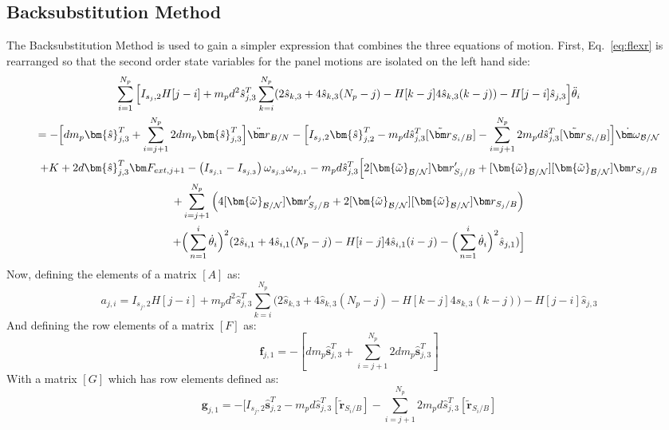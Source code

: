 \subsection{Backsubstitution Method}
The Backsubstitution Method is used to gain a simpler expression that combines the three equations of motion. First, Eq.~\eqref{eq:flexr} is rearranged so that the second order state variables for the panel motions are isolated on the left hand side:
\begin{multline}
	\sum^{N_p}_{i=1}\Big[I_{s_j,2} H[j-i] + m_p d^2 \hat{s}^{T}_{j,3} \sum^{N_p}_{k=i}(2\hat{s}_{k,3}+4\hat{s}_{k,3}(N_p-j) -H[k-j] 4\hat{s}_{k,3}(k-j)) - H[j-i]\hat{s}_{j,3} \Big] \ddot{\theta}_i \\
	= - \Big[d m_p\bm{\hat{s}}^{T}_{j,3}+\sum^{N_p}_{i=j+1}2 d m_p\bm{\hat{s}}^{T}_{j,3}\Big]\ddot{\bm r}_{B/N} - \Big[I_{s_j,2} \bm{\hat{s}}_{j,2}^T -m_p d \hat{s}^{T}_{j,3}[\tilde{{\bm r}}_{S_{i}/B}]-\sum^{N_p}_{i=j+1} 2 m_p d \hat{s}^{T}_{j,3}[\tilde{{\bm r}}_{S_{i}/B}]\Big]\dot{\bm\omega}_{\cal B/N} \\
	+ K + 2d\bm{\hat{s}}^{T}_{j,3}\bm F_{ext,j+1} - \left( I_{s_{j,1}} - I_{s_{j,3}}\right) \omega_{s_{j,3}} \omega_{s_{j,1}} - m_p d \hat{s}^{T}_{j,3}\Big[2[\bm{\tilde{\omega}}_{\cal B/N}]\bm r'_{S_{j}/B} + [\bm{\tilde{\omega}}_{\cal B/N}][\bm{\tilde{\omega}}_{\cal B/N}]\bm r_{S_{j}/B}\\
	+\sum^{N_p}_{i=j+1}\Big(4[\bm{\tilde{\omega}}_{\cal B/N}]\bm r'_{S_{j}/B} + 2[\bm{\tilde{\omega}}_{\cal B/N}][\bm{\tilde{\omega}}_{\cal B/N}]\bm r_{S_{j}/B} \Big) \\
	+ \Big( \sum^{i}_{n=1} \dot{\theta}_i \Big)^2 (2\hat{s}_{i,1}+4\hat{s}_{i,1}(N_p-j) -H[i-j] 4\hat{s}_{i,1}(i-j) - \Big( \sum^{i}_{n=1} \dot{\theta}_i\Big)^2 \hat{s}_{j,1} )\Big]
	\label{eq:spMotion1}
\end{multline}
Now, defining the elements of a matrix $[A]$ as:
\begin{equation}
	a_{j,i} = I_{s_j,2} H[j-i] + m_p d^2 \hat{s}^{T}_{j,3} \sum^{N_p}_{k=i}\Big(2\hat{s}_{k,3}+4\hat{s}_{k,3}(N_p-j) -H[k-j] 4\hat{s}_{k,3}(k-j)\Big) - H[j-i]\hat{s}_{j,3}
\end{equation}
And defining the row elements of a matrix $[F]$ as:
\begin{equation}
	\bm f_{j,1} =  - [d m_p \bm{\hat{s}}^{T}_{j,3}+\sum^{N_p}_{i=j+1}2 d m_p\bm{\hat{s}}^{T}_{j,3}]
\end{equation}
With a matrix $[G]$ which has row elements defined as:
\begin{equation}
	\bm g_{j,1} =  -[I_{s_j,2} \bm{\hat{s}}_{j,2}^T -m_p d \hat{s}^{T}_{j,3}[\tilde{{\bm r}}_{S_{i}/B}]-\sum^{N_p}_{i=j+1} 2 m_p d \hat{s}^{T}_{j,3}[\tilde{{\bm r}}_{S_{i}/B}]
\end{equation}
